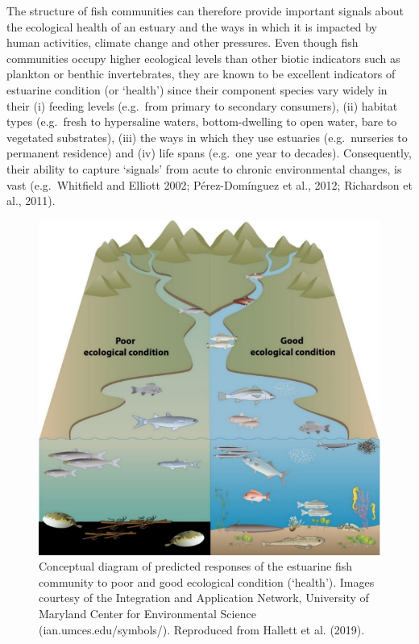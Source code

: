 \documentclass[
]{book}
\begin{document}
The structure of fish communities can therefore provide important signals about the ecological health of an estuary and the ways in which it is impacted by human activities, climate change and other pressures. Even though fish communities occupy higher ecological levels than other biotic indicators such as plankton or benthic invertebrates, they are known to be excellent indicators of estuarine condition (or `health') since their component species vary widely in their (i) feeding levels (e.g.~from primary to secondary consumers), (ii) habitat types (e.g.~fresh to hypersaline waters, bottom-dwelling to open water, bare to vegetated substrates), (iii) the ways in which they use estuaries (e.g.~nurseries to permanent residence) and (iv) life spans (e.g.~one year to decades). Consequently, their ability to capture `signals' from acute to chronic environmental changes, is vast (e.g.~Whitfield and Elliott 2002; Pérez-Domínguez et al., 2012; Richardson et al., 2011).

\begin{figure}
\includegraphics[width=0.75\linewidth]{images/fish_ecology/picture3} \caption{Conceptual diagram of predicted responses of the estuarine fish community to poor and good ecological condition (‘health’). Images courtesy of the Integration and Application Network, University of Maryland Center for Environmental Science (ian.umces.edu/symbols/). Reproduced from Hallett et al. (2019).}\label{fig:fish-ecology-pic3}
\end{figure}
\end{document}
